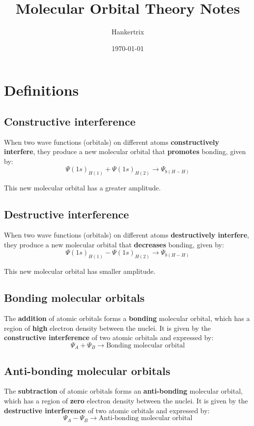 \documentclass[11pt]{article}
\author{Hankertrix}
\date{\today}
\title{Molecular Orbital Theory Notes}
\begin{document}
\maketitle
\setcounter{tocdepth}{2}
\tableofcontents \clearpage\section{Definitions}
\label{sec:org140bbc3}

\subsection{Constructive interference}
\label{sec:org6a34634}
When two wave functions (orbitals) on different atoms \textbf{constructively interfere}, they produce a new molecular orbital that \textbf{promotes} bonding, given by:
\[\Psi(1s)_{H(1)} + \Psi(1s)_{H(2)} \rightarrow \Psi_{b(H-H)}\]

This new molecular orbital has a greater amplitude.
\subsection{Destructive interference}
\label{sec:org8897278}
When two wave functions (orbitals) on different atoms \textbf{destructively interfere}, they produce a new molecular orbital that \textbf{decreases} bonding, given by:
\[\Psi(1s)_{H(1)} - \Psi(1s)_{H(2)} \rightarrow \Psi_{b(H-H)}\]

This new molecular orbital has smaller amplitude.
\subsection{Bonding molecular orbitals}
\label{sec:org4490fd4}
The \textbf{addition} of atomic orbitals forms a \textbf{bonding} molecular orbital, which has a region of \textbf{high} electron density between the nuclei. It is given by the \textbf{constructive interference} of two atomic orbitals and expressed by:
\[\Psi_A + \Psi_B \rightarrow \text{Bonding molecular orbital}\]
\subsection{Anti-bonding molecular orbitals}
\label{sec:org349411b}
The \textbf{subtraction} of atomic orbitals forms an \textbf{anti-bonding} molecular orbital, which has a region of \textbf{zero} electron density between the nuclei. It is given by the \textbf{destructive interference} of two atomic orbitals and expressed by:
\[\Psi_A - \Psi_B \rightarrow \text{Anti-bonding molecular orbital}\]
\end{document}
